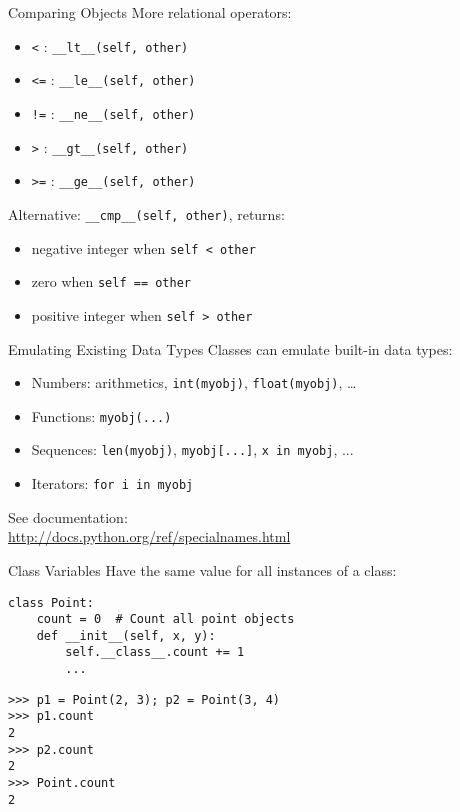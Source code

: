 \begin{frame}[fragile]{Comparing Objects}
More relational operators:
\begin{itemize}
\item \texttt{<} : \lstinline{__lt__(self, other)}
\item \texttt{<=} : \lstinline{__le__(self, other)}
\item \texttt{!=} : \lstinline{__ne__(self, other)}
\item \texttt{>} : \lstinline{__gt__(self, other)}
\item \texttt{>=} : \lstinline{__ge__(self, other)}
\end{itemize}
\vspace{2mm}
Alternative: \lstinline{__cmp__(self, other)}, returns:
\begin{itemize}
\item negative integer when \lstinline{self < other}
\item zero when \lstinline{self == other}
\item positive integer when \lstinline{self > other}
\end{itemize}
\end{frame}

\begin{frame}{Emulating Existing Data Types}
Classes can emulate built-in data types:
\begin{itemize}
\item Numbers: arithmetics, \texttt{int(myobj)}, \texttt{float(myobj)}, \dots
\item Functions: \texttt{myobj(...)}
\item Sequences: \texttt{len(myobj)}, \texttt{myobj[...]}, \lstinline{x in myobj}, ...
\item Iterators: \lstinline{for i in myobj}
\end{itemize}
\vspace{2mm}
See documentation:\\
\href{http://docs.python.org/ref/specialnames.html}{http://docs.python.org/ref/specialnames.html}
\end{frame}

\begin{frame}[fragile]{Class Variables}
Have the same value for all instances of a class:
\begin{lstlisting}[style=Python]
class Point:
    count = 0  # Count all point objects
    def __init__(self, x, y):
        self.__class__.count += 1
        ...
\end{lstlisting}
\begin{lstlisting}[style=Shell]
>>> p1 = Point(2, 3); p2 = Point(3, 4)
>>> p1.count
2
>>> p2.count
2
>>> Point.count
2
\end{lstlisting}
\end{frame}

